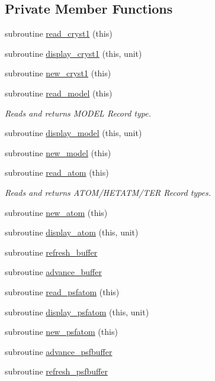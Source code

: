 \subsection*{Private Member Functions}
\begin{DoxyCompactItemize}
\item 
subroutine \hyperlink{classmolreader_af85c1b386f0dc78ebf55e003b4f8c83a}{read\+\_\+cryst1} (this)
\item 
subroutine \hyperlink{classmolreader_ac9a2b0ff287faa780311cc432b866610}{display\+\_\+cryst1} (this, unit)
\item 
subroutine \hyperlink{classmolreader_ac284dc33f40874d6156c1cd36781002c}{new\+\_\+cryst1} (this)
\item 
subroutine \hyperlink{classmolreader_a64ff990dc05c01debc1138dd012f4bcb}{read\+\_\+model} (this)
\begin{DoxyCompactList}\small\item\em Reads and returns M\+O\+D\+E\+L Record type. \end{DoxyCompactList}\item 
subroutine \hyperlink{classmolreader_a462d061944b74f7145b8bf89fc3439fc}{display\+\_\+model} (this, unit)
\item 
subroutine \hyperlink{classmolreader_a8edb660b2e1b64a5d78593c734afbe95}{new\+\_\+model} (this)
\item 
subroutine \hyperlink{classmolreader_a49ccaf345b633e27f69ad7a5a8637a2a}{read\+\_\+atom} (this)
\begin{DoxyCompactList}\small\item\em Reads and returns A\+T\+O\+M/\+H\+E\+T\+A\+T\+M/\+T\+E\+R Record types. \end{DoxyCompactList}\item 
subroutine \hyperlink{classmolreader_ae1000e1ea4e46f858a3640c08563c3ff}{new\+\_\+atom} (this)
\item 
subroutine \hyperlink{classmolreader_adb757da4ec2256578422254dad5b262e}{display\+\_\+atom} (this, unit)
\item 
subroutine \hyperlink{classmolreader_a16d4776fded57cf8aa38f639610cad84}{refresh\+\_\+buffer}
\item 
subroutine \hyperlink{classmolreader_ac7b950f165e89b12ccc8fff1c0f3bae9}{advance\+\_\+buffer}
\item 
subroutine \hyperlink{classmolreader_a81fcc5a3f49380ccd10b02b229f5067d}{read\+\_\+psfatom} (this)
\item 
subroutine \hyperlink{classmolreader_a737dbe023a6cbecab8269981ffdfa31c}{display\+\_\+psfatom} (this, unit)
\item 
subroutine \hyperlink{classmolreader_a56968311293e3c68022fe3bbe3600306}{new\+\_\+psfatom} (this)
\item 
subroutine \hyperlink{classmolreader_abf243c87d2f9429f3ed94293d438c7c7}{advance\+\_\+psfbuffer}
\item 
subroutine \hyperlink{classmolreader_a13131c46b34d0385ba7eadd0b1b88df9}{refresh\+\_\+psfbuffer}
\end{DoxyCompactItemize}
